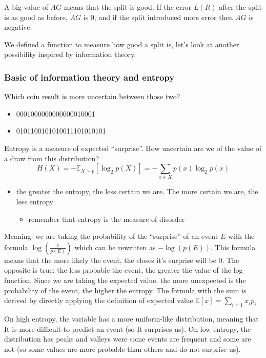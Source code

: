 \documentclass{article}
\begin{document}
A big value of \(AG\) means that the split is good. If the error
\(L(R)\) after the split is as good as before, \(AG\) is \(0\), and if
the split introduced more error then \(AG\) is negative.

We defined a function to measure how good a split is, let's look at
another possibility inspired by information theory.

\subsubsection{Basic of information theory and
entropy}\label{basic-of-information-theory-and-entropy}

Which coin result is more uncertain between those two?

\begin{itemize}
\tightlist
\item
  0001000000000000010001
\item
  0101100101010011101010101
\end{itemize}

Entropy is a measure of expected ``surprise''. How uncertain are we of
the value of a draw from this distribution?
\[H(X) = -\mathbb{E}_{X\sim p}[\log_2 p(X)] = -\sum_{x\in X} p(x)\log_2p(x)\]

\begin{itemize}
\tightlist
\item
  the greater the entropy, the less certain we are. The more certain we
  are, the less entropy

  \begin{itemize}
  \tightlist
  \item
    remember that entropy is the measure of disorder
  \end{itemize}
\end{itemize}

Meaning: we are taking the probability of the ``surprise'' of an event
\(E\) with the formula \(\log(\frac{1}{p(E)})\) which can be rewritten
as \(-\log(p(E))\). This formula means that the more likely the event,
the closes it's surprise will be 0. The opposite is true: the less
probable the event, the greater the value of the log function. Since we
are taking the expected value, the more unexpected is the probability of
the event, the higher the entropy. The formula with the sum is derived
by directly applying the definition of expected value
\(\mathbb{E}[x]=\sum_{i=1}x_i p_i\)

On high entropy, the variable has a more uniform-like distribution,
meaning that It is more difficult to predict an event (so It surprises
us). On low entropy, the distribution has peaks and valleys were some
events are frequent and some are not (so some values are more probable
than others and do not surprise us).
\end{document}
